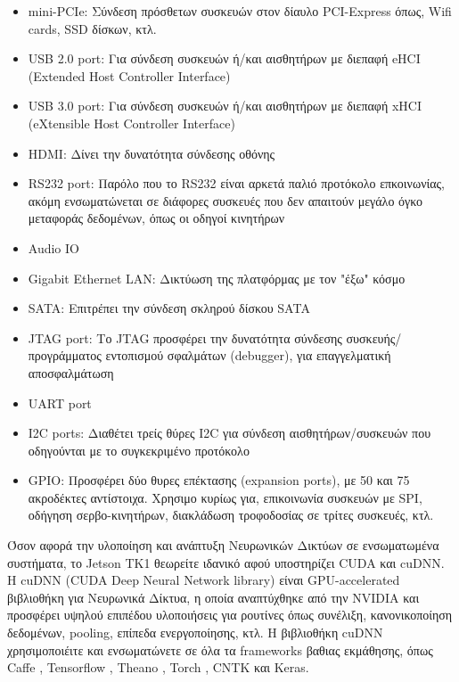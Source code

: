 \begin{itemize}
  \item{mini-PCIe: Σύνδεση πρόσθετων συσκευών στον δίαυλο PCI-Express όπως, Wifi cards, SSD δίσκων, κτλ.}
  \item{USB 2.0 port: Για σύνδεση συσκευών ή/και αισθητήρων με διεπαφή eHCI (Extended Host Controller Interface)}
  \item{USB 3.0 port: Για σύνδεση συσκευών ή/και αισθητήρων με διεπαφή xHCI (eXtensible Host Controller Interface)}
  \item{HDMI: Δίνει την δυνατότητα σύνδεσης οθόνης}
  \item{RS232 port: Παρόλο που το RS232 είναι αρκετά παλιό προτόκολο επκοινωνίας, ακόμη ενσωματώνεται σε διάφορες συσκευές που δεν απαιτούν μεγάλο όγκο μεταφοράς δεδομένων, όπως οι οδηγοί κινητήρων}
  \item{Audio IO}
  \item{Gigabit Ethernet LAN: Δικτύωση της πλατφόρμας με τον "έξω" κόσμο}
  \item{SATA: Επιτρέπει την σύνδεση σκληρού δίσκου SATA}
  \item{JTAG port: Το JTAG προσφέρει την δυνατότητα σύνδεσης συσκευής/προγράμματος εντοπισμού σφαλμάτων (debugger), για επαγγελματική αποσφαλμάτωση}
  \item{UART port}
  \item{I2C ports: Διαθέτει τρείς θύρες I2C για σύνδεση αισθητήρων/συσκευών που οδηγούνται με το συγκεκριμένο προτόκολο}
  \item{GPIO: Προσφέρει δύο θυρες επέκτασης (expansion ports), με 50 και 75 ακροδέκτες αντίστοιχα. Χρησιμο κυρίως για, επικοινωνία συσκευών με SPI, οδήγηση σερβο-κινητήρων, διακλάδωση τροφοδοσίας σε τρίτες συσκευές, κτλ.}
\end{itemize}

Όσον αφορά την υλοποίηση και ανάπτυξη Νευρωνικών Δικτύων σε ενσωματωμένα συστήματα, το Jetson TK1 θεωρείτε ιδανικό
αφού υποστηρίζει CUDA και cuDNN. H cuDNN (CUDA Deep Neural Network library) είναι GPU-accelerated βιβλιοθήκη για Νευρωνικά Δίκτυα,
η οποία αναπτύχθηκε από την NVIDIA και προσφέρει υψηλού επιπέδου υλοποιήσεις για ρουτίνες όπως συνέλιξη, κανονικοποίηση δεδομένων, pooling, επίπεδα ενεργοποίησης, κτλ.
Η βιβλιοθήκη cuDNN χρησιμοποιέιτε και ενσωματώνετε σε όλα τα frameworks βαθιας εκμάθησης, όπως Caffe \cite{jia2014caffe}, Tensorflow \cite{DBLP:journals/corr/AbadiBCCDDDGIIK16}, Theano \cite{2016arXiv160502688full}\cite{bergstra+al:2010-scipy}\cite{Bastien-Theano-2012}, Torch \cite{collobert2002torch}\cite{collobert2011torch7}\cite{collobert2012implementing}, CNTΚ και Keras.
